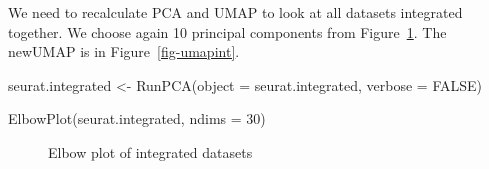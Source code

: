 \documentclass[
  letterpaper,
  DIV=11,
  numbers=noendperiod]{scrartcl}
\newenvironment{Shaded}{\begin{snugshade}}{\end{snugshade}}
\newcommand{\AttributeTok}[1]{\textcolor[rgb]{0.40,0.45,0.13}{#1}}
\newcommand{\ConstantTok}[1]{\textcolor[rgb]{0.56,0.35,0.01}{#1}}
\newcommand{\DecValTok}[1]{\textcolor[rgb]{0.68,0.00,0.00}{#1}}
\newcommand{\FunctionTok}[1]{\textcolor[rgb]{0.28,0.35,0.67}{#1}}
\newcommand{\NormalTok}[1]{\textcolor[rgb]{0.00,0.23,0.31}{#1}}
\newcommand{\OtherTok}[1]{\textcolor[rgb]{0.00,0.23,0.31}{#1}}
\begin{document}
We need to recalculate PCA and UMAP to look at all datasets integrated
together. We choose again 10 principal components from
Figure~\ref{fig-elbowint}. The newUMAP is in Figure~\ref{fig-umapint}.

\begin{Shaded}
\begin{Highlighting}[]
\NormalTok{seurat.integrated }\OtherTok{\textless{}{-}} \FunctionTok{RunPCA}\NormalTok{(}\AttributeTok{object =}\NormalTok{ seurat.integrated, }\AttributeTok{verbose =} \ConstantTok{FALSE}\NormalTok{)}
\end{Highlighting}
\end{Shaded}

\begin{Shaded}
\begin{Highlighting}[]
\FunctionTok{ElbowPlot}\NormalTok{(seurat.integrated, }\AttributeTok{ndims =} \DecValTok{30}\NormalTok{)}
\end{Highlighting}
\end{Shaded}

\begin{figure}[H]


\caption{\label{fig-elbowint}Elbow plot of integrated datasets}

\end{figure}%
\end{document}
